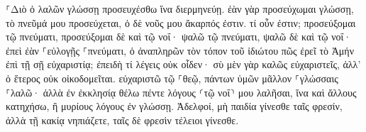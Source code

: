 \documentclass{openreader}
\begin{document}
⸀Διὸ ὁ λαλῶν γλώσσῃ προσευχέσθω ἵνα διερμηνεύῃ. 
ἐὰν γὰρ προσεύχωμαι γλώσσῃ, τὸ πνεῦμά μου προσεύχεται, ὁ δὲ νοῦς μου ἄκαρπός ἐστιν. 
τί οὖν ἐστιν; προσεύξομαι τῷ πνεύματι, προσεύξομαι δὲ καὶ τῷ νοΐ· ψαλῶ τῷ πνεύματι, ψαλῶ δὲ καὶ τῷ νοΐ· 
ἐπεὶ ἐὰν ⸀εὐλογῇς ⸀πνεύματι, ὁ ἀναπληρῶν τὸν τόπον τοῦ ἰδιώτου πῶς ἐρεῖ τὸ Ἀμήν ἐπὶ τῇ σῇ εὐχαριστίᾳ; ἐπειδὴ τί λέγεις οὐκ οἶδεν· 
σὺ μὲν γὰρ καλῶς εὐχαριστεῖς, ἀλλ’ ὁ ἕτερος οὐκ οἰκοδομεῖται. 
εὐχαριστῶ τῷ ⸀θεῷ, πάντων ὑμῶν μᾶλλον ⸀γλώσσαις ⸀λαλῶ· 
ἀλλὰ ἐν ἐκκλησίᾳ θέλω πέντε λόγους ⸂τῷ νοΐ⸃ μου λαλῆσαι, ἵνα καὶ ἄλλους κατηχήσω, ἢ μυρίους λόγους ἐν γλώσσῃ. 
Ἀδελφοί, μὴ παιδία γίνεσθε ταῖς φρεσίν, ἀλλὰ τῇ κακίᾳ νηπιάζετε, ταῖς δὲ φρεσὶν τέλειοι γίνεσθε. 
\end{document}
